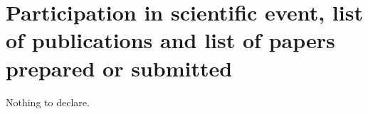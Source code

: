 \chapter{Participation in scientific event, list of publications and list of papers prepared or submitted}\label{chp:participacao}

Nothing to declare.